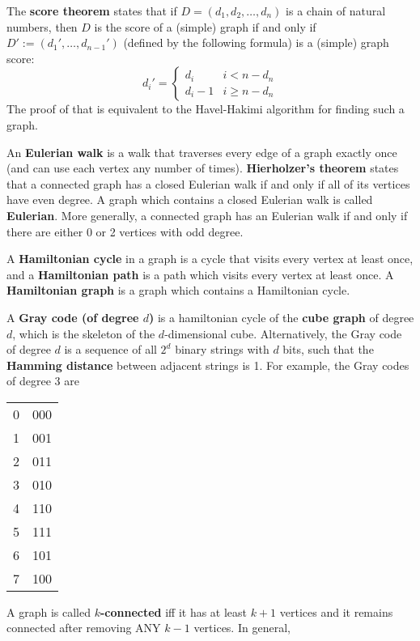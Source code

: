 \documentclass[12pt]{article}
\begin{document}
The \textbf{score theorem} states that if $D=(d_1, d_2, \dots, d_n)$ is a chain of natural numbers, then $D$ is the score of a (simple) graph if and only if $D':=(d_1', \dots, d_{n-1}')$ (defined by the following formula) is a (simple) graph score:
\[ d_i' = \begin{cases}
    d_i & i < n-d_n \\
    d_i-1 & i \geq n-d_n
\end{cases} \]
The proof of that is equivalent to the Havel-Hakimi algorithm for finding such a graph.
\par
An \textbf{Eulerian walk} is a walk that traverses every edge of a graph exactly once (and can use each vertex any number of times). \textbf{Hierholzer's theorem} states that a connected graph has a closed Eulerian walk if and only if all of its vertices have even degree. A graph which contains a closed Eulerian walk is called \textbf{Eulerian}. More generally, a connected graph has an Eulerian walk if and only if there are either 0 or 2 vertices with odd degree.
\par
A \textbf{Hamiltonian cycle} in a graph is a cycle that visits every vertex at least once, and a \textbf{Hamiltonian path} is a path which visits every vertex at least once. A \textbf{Hamiltonian graph} is a graph which contains a Hamiltonian cycle.
\par
A \textbf{Gray code (of degree $d$)} is a hamiltonian cycle of the \textbf{cube graph} of degree $d$, which is the skeleton of the $d$-dimensional cube. Alternatively, the Gray code of degree $d$ is a sequence of all $2^d$ binary strings with $d$ bits, such that the \textbf{Hamming distance} between adjacent strings is 1. For example, the Gray codes of degree 3 are
\begin{center}
    \begin{tabular}{|c|c|}
        \hline
        0 & 000 \\
        1 & 001 \\
        2 & 011 \\
        3 & 010 \\
        4 & 110 \\
        5 & 111 \\
        6 & 101 \\
        7 & 100 \\
        \hline
    \end{tabular}
\end{center}
\par
A graph is called \textbf{$k$-connected} iff it has at least $k+1$ vertices and it remains connected after removing ANY $k-1$ vertices. In general,
\end{document}
